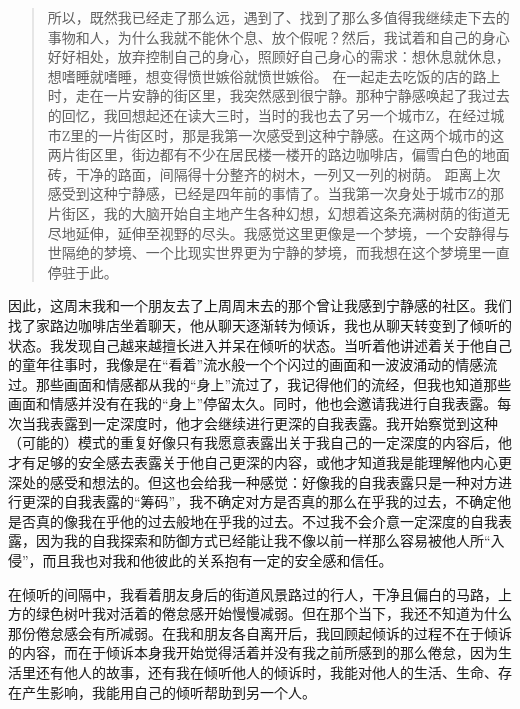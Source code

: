 \blockquote{
    所以，既然我已经走了那么远，遇到了、找到了那么多值得我继续走下去的事物和人，为什么我就不能休个息、放个假呢？然后，我试着和自己的身心好好相处，放弃控制自己的身心，照顾好自己身心的需求：想休息就休息，想嗜睡就嗜睡，想变得愤世嫉俗就愤世嫉俗。
    在一起走去吃饭的店的路上时，走在一片安静的街区里，我突然感到很宁静。那种宁静感唤起了我过去的回忆，我回想起还在读大三时，当时的我也去了另一个城市Z，在经过城市Z里的一片街区时，那是我第一次感受到这种宁静感。在这两个城市的这两片街区里，街边都有不少在居民楼一楼开的路边咖啡店，偏雪白色的地面砖，干净的路面，间隔得十分整齐的树木，一列又一列的树荫。
    距离上次感受到这种宁静感，已经是四年前的事情了。当我第一次身处于城市Z的那片街区，我的大脑开始自主地产生各种幻想，幻想着这条充满树荫的街道无尽地延伸，延伸至视野的尽头。我感觉这里更像是一个梦境，一个安静得与世隔绝的梦境、一个比现实世界更为宁静的梦境，而我想在这个梦境里一直停驻于此。
    
}

因此，这周末我和一个朋友去了上周周末去的那个曾让我感到宁静感的社区。我们找了家路边咖啡店坐着聊天，他从聊天逐渐转为倾诉，我也从聊天转变到了倾听的状态。我发现自己越来越擅长进入并呆在倾听的状态。当听着他讲述着关于他自己的童年往事时，我像是在“看着”流水般一个个闪过的画面和一波波涌动的情感流过。那些画面和情感都从我的“身上”流过了，我记得他们的流经，但我也知道那些画面和情感并没有在我的“身上”停留太久。同时，他也会邀请我进行自我表露。每次当我表露到一定深度时，他才会继续进行更深的自我表露。我开始察觉到这种（可能的）模式的重复\pozhehao{}好像只有我愿意表露出关于我自己的一定深度的内容后，他才有足够的安全感去表露关于他自己更深的内容，或他才知道我是能理解他内心更深处的感受和想法的。但这也会给我一种感觉：好像我的自我表露只是一种对方进行更深的自我表露的“筹码”，我不确定对方是否真的那么在乎我的过去，不确定他是否真的像我在乎他的过去般地在乎我的过去。不过我不会介意一定深度的自我表露，因为我的自我探索和防御方式已经能让我不像以前一样那么容易被他人所“入侵”，而且我也对我和他彼此的关系抱有一定的安全感和信任。

\tristarsepline

在倾听的间隔中，我看着朋友身后的街道风景\pozhehao{}路过的行人，干净且偏白的马路，上方的绿色树叶\pozhehao{}我对活着的倦怠感开始慢慢减弱。但在那个当下，我还不知道为什么那份倦怠感会有所减弱。在我和朋友各自离开后，我回顾起倾诉的过程\pozhehao{}不在于倾诉的内容，而在于倾诉本身\pozhehao{}我开始觉得活着并没有我之前所感到的那么倦怠，因为生活里还有他人的故事，还有我在倾听他人的倾诉时，我能对他人的生活、生命、存在产生影响，我能用自己的倾听帮助到另一个人。

